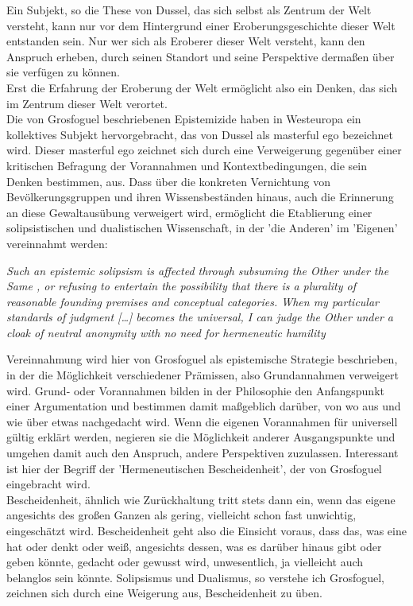 Ein Subjekt, so die These von Dussel, das sich selbst als Zentrum der Welt
versteht, kann nur vor dem Hintergrund einer Eroberungsgeschichte dieser Welt
entstanden sein. Nur wer sich als Eroberer dieser Welt versteht, kann den
Anspruch erheben, durch seinen Standort und seine Perspektive dermaßen über sie
verfügen zu können.\\
Erst die Erfahrung der Eroberung der Welt ermöglicht also
ein Denken, das sich im Zentrum dieser Welt verortet. \\
Die von Grosfoguel
beschriebenen Epistemizide haben in Westeuropa ein kollektives Subjekt
hervorgebracht, das von Dussel als \glqq masterful ego \grqq \footnotemark
{} bezeichnet wird. Dieser
\glqq masterful ego \grqq zeichnet sich durch eine Verweigerung gegenüber einer
kritischen Befragung der Vorannahmen und Kontextbedingungen, die sein Denken
bestimmen, aus. Dass über die konkreten Vernichtung von Bevölkerungsgruppen und
ihren Wissensbeständen hinaus, auch die Erinnerung an diese Gewaltausübung
verweigert wird, ermöglicht die Etablierung einer solipsistischen und
dualistischen Wissenschaft, in der 'die Anderen' im 'Eigenen' vereinnahmt
werden:
\begin{myenv} 
  \textit{\glqq Such an epistemic solipsism is affected through
    subsuming  \glqq the Other under the Same \grqq, or refusing to entertain the
    possibility that there is a plurality of reasonable founding premises and
    conceptual categories. When my particular standards of judgment […] becomes
    the universal, I can judge the Other under a cloak of neutral anonymity
    with no need for hermeneutic humility
    \grqq \footnotemark {} }
\end{myenv}
Vereinnahmung wird hier von Grosfoguel als epistemische Strategie beschrieben,
in der die Möglichkeit verschiedener Prämissen, also Grundannahmen verweigert
wird. Grund- oder Vorannahmen bilden in der Philosophie den Anfangspunkt einer
Argumentation und bestimmen damit maßgeblich darüber, von wo aus und wie über
etwas nachgedacht wird. Wenn die eigenen Vorannahmen für universell gültig
erklärt werden, negieren sie die Möglichkeit anderer Ausgangspunkte und umgehen
damit auch den Anspruch, andere Perspektiven zuzulassen. Interessant ist hier
der Begriff der 'Hermeneutischen Bescheidenheit', der von Grosfoguel
eingebracht wird. \\
Bescheidenheit, ähnlich wie Zurückhaltung tritt stets dann
ein, wenn das eigene angesichts des großen Ganzen als gering, vielleicht schon
fast unwichtig, eingeschätzt wird. Bescheidenheit geht also die Einsicht
voraus, dass das, was eine hat oder denkt oder weiß, angesichts dessen, was es
darüber hinaus gibt oder geben könnte, gedacht oder gewusst wird, unwesentlich,
ja vielleicht auch belanglos sein könnte. Solipsismus und Dualismus, so
verstehe ich Grosfoguel, zeichnen sich durch eine Weigerung aus, Bescheidenheit
zu üben.\\

